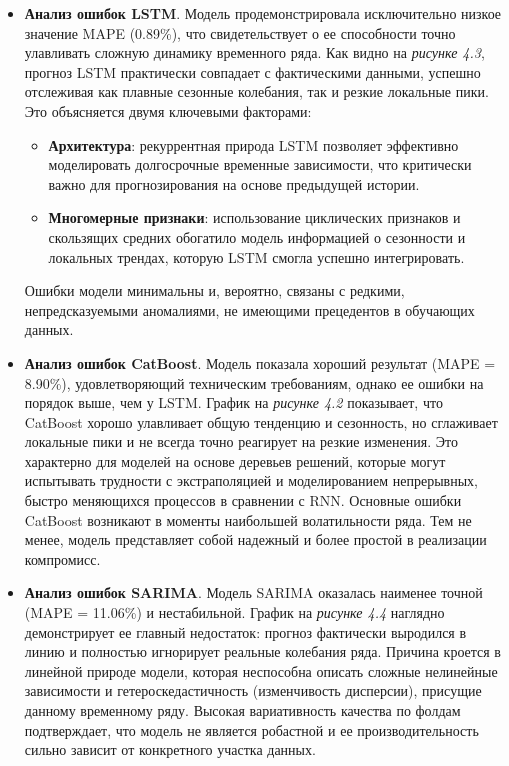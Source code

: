 \begin{itemize}
    \item \textbf{Анализ ошибок LSTM}. Модель продемонстрировала исключительно низкое значение MAPE (0.89\%), что свидетельствует о ее способности точно улавливать сложную динамику временного ряда. Как видно на \textit{рисунке 4.3}, прогноз LSTM практически совпадает с фактическими данными, успешно отслеживая как плавные сезонные колебания, так и резкие локальные пики. Это объясняется двумя ключевыми факторами:
    \begin{itemize}
        \item \textbf{Архитектура}: рекуррентная природа LSTM позволяет эффективно моделировать долгосрочные временные зависимости, что критически важно для прогнозирования на основе предыдущей истории.
        \item \textbf{Многомерные признаки}: использование циклических признаков и скользящих средних обогатило модель информацией о сезонности и локальных трендах, которую LSTM смогла успешно интегрировать.
    \end{itemize}
    Ошибки модели минимальны и, вероятно, связаны с редкими, непредсказуемыми аномалиями, не имеющими прецедентов в обучающих данных.

    \item \textbf{Анализ ошибок CatBoost}. Модель показала хороший результат (MAPE = 8.90\%), удовлетворяющий техническим требованиям, однако ее ошибки на порядок выше, чем у LSTM. График на \textit{рисунке 4.2} показывает, что CatBoost хорошо улавливает общую тенденцию и сезонность, но сглаживает локальные пики и не всегда точно реагирует на резкие изменения. Это характерно для моделей на основе деревьев решений, которые могут испытывать трудности с экстраполяцией и моделированием непрерывных, быстро меняющихся процессов в сравнении с RNN. Основные ошибки CatBoost возникают в моменты наибольшей волатильности ряда. Тем не менее, модель представляет собой надежный и более простой в реализации компромисс.

    \item \textbf{Анализ ошибок SARIMA}. Модель SARIMA оказалась наименее точной (MAPE = 11.06\%) и нестабильной. График на \textit{рисунке 4.4} наглядно демонстрирует ее главный недостаток: прогноз фактически выродился в линию и полностью игнорирует реальные колебания ряда. Причина кроется в линейной природе модели, которая неспособна описать сложные нелинейные зависимости и гетероскедастичность (изменчивость дисперсии), присущие данному временному ряду. Высокая вариативность качества по фолдам подтверждает, что модель не является робастной и ее производительность сильно зависит от конкретного участка данных.


\end{itemize}
